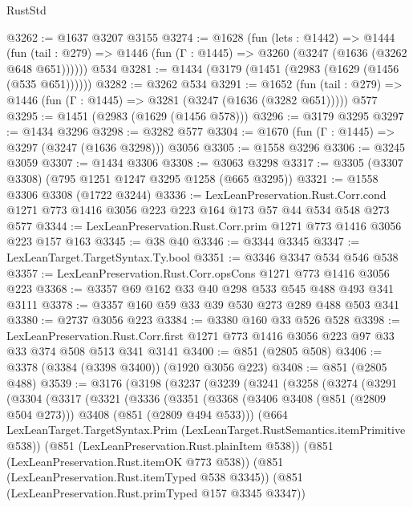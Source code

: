 \begin{lexlean}{RustStd}
\begin{coremodule}
@3262 := @1637 @3207 @3155
@3274 := @1628
    (fun (lets : @1442) =>
    @1444 (fun (tail : @279) => @1446 (fun (Γ : @1445) => @3260 (@3247 (@1636 (@3262 @648 @651))))))
    @534
@3281 := @1434 (@3179 (@1451 (@2983 (@1629 (@1456 (@535 @651))))))
@3282 := @3262 @534
@3291 := @1652
    (fun (tail : @279) => @1446 (fun (Γ : @1445) => @3281 (@3247 (@1636 (@3282 @651)))))
    @577
@3295 := @1451 (@2983 (@1629 (@1456 @578)))
@3296 := @3179 @3295
@3297 := @1434 @3296
@3298 := @3282 @577
@3304 := @1670 (fun (Γ : @1445) => @3297 (@3247 (@1636 @3298))) @3056
@3305 := @1558 @3296
@3306 := @3245 @3059
@3307 := @1434 @3306
@3308 := @3063 @3298
@3317 := @3305 (@3307 @3308) (@795 @1251 @1247 @3295 @1258 (@665 @3295))
@3321 := @1558 @3306 @3308 (@1722 @3244)
@3336 := LexLeanPreservation.Rust.Corr.cond
    @1271
    @773
    @1416
    @3056
    @223
    @223
    @164
    @173
    @57
    @44
    @534
    @548
    @273
    @577
@3344 := LexLeanPreservation.Rust.Corr.prim @1271 @773 @1416 @3056 @223 @157 @163
@3345 := @38 @40
@3346 := @3344 @3345
@3347 := LexLeanTarget.TargetSyntax.Ty.bool
@3351 := @3346 @3347 @534 @546 @538
@3357 := LexLeanPreservation.Rust.Corr.opsCons @1271 @773 @1416 @3056 @223
@3368 := @3357 @69 @162 @33 @40 @298 @533 @545 @488 @493 @341 @3111
@3378 := @3357 @160 @59 @33 @39 @530 @273 @289 @488 @503 @341
@3380 := @2737 @3056 @223
@3384 := @3380 @160 @33 @526 @528
@3398 := LexLeanPreservation.Rust.Corr.first
    @1271
    @773
    @1416
    @3056
    @223
    @97
    @33
    @33
    @374
    @508
    @513
    @341
    @3141
@3400 := @851 (@2805 @508)
@3406 := @3378 (@3384 (@3398 @3400)) (@1920 @3056 @223)
@3408 := @851 (@2805 @488)
@3539 := @3176
    (@3198
      (@3237
        (@3239
          (@3241
            (@3258
              (@3274
                (@3291
                  (@3304
                    (@3317
                      (@3321
                        (@3336
                          (@3351
                            (@3368
                              (@3406 @3408 (@851 (@2809 @504 @273)))
                              @3408
                              (@851 (@2809 @494 @533)))
                            (@664
                              LexLeanTarget.TargetSyntax.Prim
                              (LexLeanTarget.RustSemantics.itemPrimitive @538))
                            (@851 (LexLeanPreservation.Rust.plainItem @538))
                            (@851 (LexLeanPreservation.Rust.itemOK @773 @538))
                            (@851 (LexLeanPreservation.Rust.itemTyped @538 @3345))
                            (@851 (LexLeanPreservation.Rust.primTyped @157 @3345 @3347))

\end{coremodule}
\end{lexlean}

